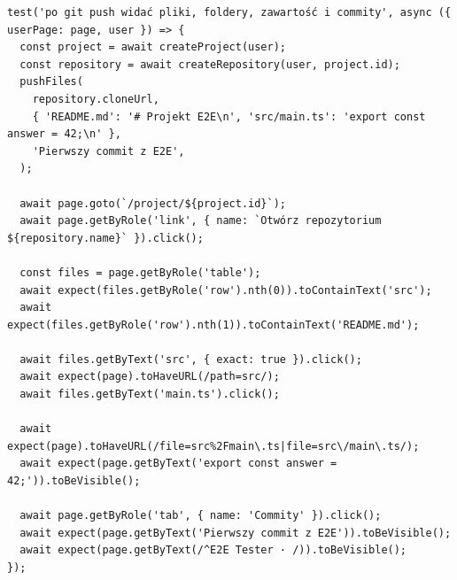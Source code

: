 \begin{lstlisting}[basicstyle=\footnotesize\ttfamily, captionpos=t, caption={Test przeglądania kodu i historii repozytorium}, label={lst:e2e-repozytorium}]
test('po git push widać pliki, foldery, zawartość i commity', async ({ userPage: page, user }) => {
  const project = await createProject(user);
  const repository = await createRepository(user, project.id);
  pushFiles(
    repository.cloneUrl,
    { 'README.md': '# Projekt E2E\n', 'src/main.ts': 'export const answer = 42;\n' },
    'Pierwszy commit z E2E',
  );

  await page.goto(`/project/${project.id}`);
  await page.getByRole('link', { name: `Otwórz repozytorium ${repository.name}` }).click();

  const files = page.getByRole('table');
  await expect(files.getByRole('row').nth(0)).toContainText('src');
  await expect(files.getByRole('row').nth(1)).toContainText('README.md');

  await files.getByText('src', { exact: true }).click();
  await expect(page).toHaveURL(/path=src/);
  await files.getByText('main.ts').click();

  await expect(page).toHaveURL(/file=src%2Fmain\.ts|file=src\/main\.ts/);
  await expect(page.getByText('export const answer = 42;')).toBeVisible();

  await page.getByRole('tab', { name: 'Commity' }).click();
  await expect(page.getByText('Pierwszy commit z E2E')).toBeVisible();
  await expect(page.getByText(/^E2E Tester · /)).toBeVisible();
});
\end{lstlisting}
